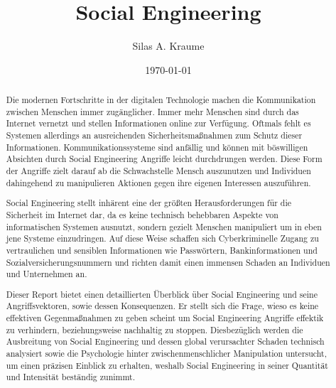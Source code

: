 \documentclass{report}
\begin{document}
\title{\Huge{Social Engineering}}
\author{Silas A. Kraume}
\date{\today}

\maketitle

\tableofcontents

\begin{abstract}
    Die modernen Fortschritte in der digitalen Technologie machen die Kommunikation zwischen Menschen immer zugänglicher.
    Immer mehr Menschen sind durch das Internet vernetzt und stellen Informationen online zur Verfügung.
    Oftmals fehlt es Systemen allerdings an ausreichenden Sicherheitsmaßnahmen zum Schutz dieser Informationen.
    Kommunikationssysteme sind anfällig und können mit böswilligen Absichten durch Social Engineering Angriffe leicht durchdrungen werden.
    Diese Form der Angriffe zielt darauf ab die Schwachstelle Mensch auszunutzen und Individuen dahingehend zu manipulieren Aktionen gegen ihre eigenen Interessen auszuführen.

    Social Engineering stellt inhärent eine der größten Herausforderungen für die Sicherheit im Internet dar,
    da es keine technisch behebbaren Aspekte von informatischen Systemen ausnutzt, sondern gezielt Menschen manipuliert um in eben jene Systeme einzudringen.
    Auf diese Weise schaffen sich Cyberkriminelle Zugang zu vertraulichen und sensiblen Informationen wie Passwörtern, Bankinformationen und Sozialversicherungsnummern
    und richten damit einen immensen Schaden an Individuen und Unternehmen an.

    Dieser Report bietet einen detaillierten Überblick über Social Engineering und seine Angriffsvektoren, sowie dessen Konsequenzen.
    Er stellt sich die Frage, wieso es keine effektiven Gegenmaßnahmen zu geben scheint um Social Engineering Angriffe effektik zu verhindern,
    beziehungsweise nachhaltig zu stoppen.
    Diesbezüglich werden die Ausbreitung von Social Engineering und dessen global verursachter Schaden technisch analysiert sowie die Psychologie hinter zwischenmenschlicher Manipulation untersucht,
    um einen präzisen Einblick zu erhalten, weshalb Social Engineering in seiner Quantität und Intensität beständig zunimmt.
\end{abstract}








{}


\end{document}
